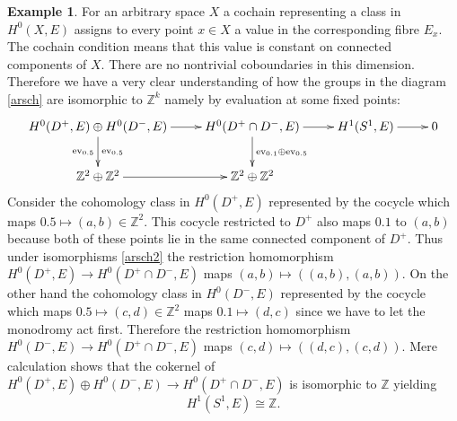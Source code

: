 \documentclass[10pt]{amsart}
\theoremstyle{definition}
\newtheorem{ex}[defn]{Example}
\theoremstyle{plain}
\theoremstyle{remark}
\newcommand{\ZZ}{\mathbb{Z}}
\newcommand{\intersection}{\cap}
\newcommand{\ev}{\mathrm{ev}}
\begin{document}
\begin{ex}
\newline
For an arbitrary space $X$ a cochain representing a class in $H^0(X,E)$ assigns to every point $x\in X$ a value in the corresponding fibre $E_x$. The cochain condition means that this value is constant on connected components of $X$. There are no nontrivial coboundaries in this dimension. Therefore we have a very clear understanding of how the groups in the diagram \ref{arsch} are isomorphic to $\ZZ^k$ namely by evaluation at some fixed points:
\begin{align}\label{arsch2}
  \xymatrix{
  H^0(D^+,E)\oplus H^0(D^-,E)\ar[r]\ar[d]_{\ev_{0.5}}^{\ev_{0.5}} & H^0(D^+\intersection D^-,E)\ar[r]\ar[d]^{\ev_{0.1}\oplus\ev_{0.5}} & H^1(S^1,E)\ar[r] & 0\\
  \ZZ^2\oplus\ZZ^2\ar[r] & \ZZ^2\oplus\ZZ^2 & & 
  }
\end{align}
Consider the cohomology class in $H^0(D^+,E)$ represented by the cocycle which maps $0.5\mapsto (a,b)\in\ZZ^2$. This cocycle restricted to $D^+$ also maps $0.1$ to $(a,b)$ because both of these points lie in the same connected component of $D^+$. Thus under isomorphisms \ref{arsch2} the restriction homomorphism $H^0(D^+,E)\to H^0(D^+\intersection D^-,E)$ maps $(a,b)\mapsto ((a,b),(a,b))$.
On the other hand the cohomology class in $H^0(D^-,E)$ represented by the cocycle which maps $0.5\mapsto (c,d)\in\ZZ^2$ maps $0.1\mapsto (d,c)$ since we have to let the monodromy act first. Therefore the restriction homomorphism $H^0(D^-,E)\to H^0(D^+\intersection D^-,E)$ maps $(c,d)\mapsto ((d,c),(c,d))$.
Mere calculation shows that the cokernel of $H^0(D^+,E)\oplus H^0(D^-,E)\to H^0(D^+\intersection D^-,E)$ is isomorphic to $\ZZ$ yielding $$H^1(S^1,E)\cong\ZZ\text{.}$$
\end{ex}
\end{document}
